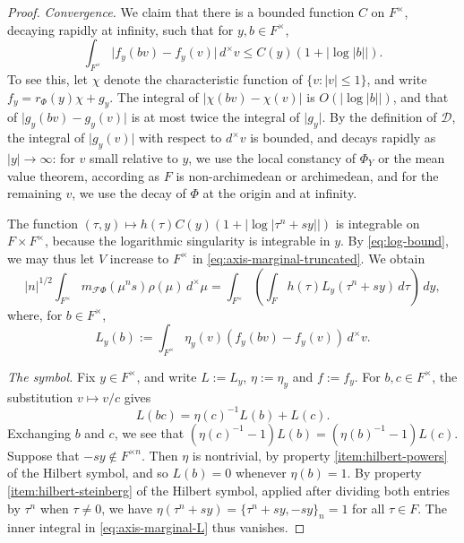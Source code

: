 \documentclass[reqno]{amsart}
\theoremstyle{plain}
\theoremstyle{definition}
\theoremstyle{itplain}
\numberwithin{equation}{section}
\numberwithin{theorem}{section}
\begin{document}
\begin{proof}
  \emph{Convergence.}  We claim that there is a bounded function $C$ on $F^\times$, decaying rapidly at infinity, such that for $y, b \in F^\times$,
  \begin{equation}\label{eq:log-bound}
    \int_{F^\times} \lvert f_y(b v) - f_y(v) \rvert \, d^\times v \leq C(y) (1 + \lvert \log \lvert b \rvert \rvert).
  \end{equation}
  To see this, let $\chi$ denote the characteristic function of $\{v : \lvert v \rvert \leq 1\}$, and write $f_y = r_\Phi(y) \chi + g_y$.  The integral of $\lvert \chi(b v) - \chi(v) \rvert$ is $O(\lvert \log \lvert b \rvert \rvert)$, and that of $\lvert g_y(b v) - g_y(v) \rvert$ is at most twice the integral of $\lvert g_y \rvert$.  By the definition of $\mathcal{D}$, the integral of $\lvert g_y(v) \rvert$ with respect to $d^\times v$ is bounded, and decays rapidly as $\lvert y \rvert \rightarrow \infty$: for $v$ small relative to $y$, we use the local constancy of $\Phi_Y$ or the mean value theorem, according as $F$ is non-archimedean or archimedean, and for the remaining $v$, we use the decay of $\Phi$ at the origin and at infinity.

  The function $(\tau, y) \mapsto h(\tau) C(y) (1 + \lvert \log \lvert \tau^n + s y \rvert \rvert)$ is integrable on $F \times F^\times$, because the logarithmic singularity is integrable in $y$.  By \eqref{eq:log-bound}, we may thus let $V$ increase to $F^\times$ in \eqref{eq:axis-marginal-truncated}.  We obtain
  \begin{equation}\label{eq:axis-marginal-L}
    \lvert n \rvert^{1/2} \int_{F^\times} m_{\mathcal{F} \Phi}(\mu^n s) \rho(\mu) \, d^\times \mu
    = \int_{F^\times} \left( \int_F h(\tau) L_y(\tau^n + s y) \, d \tau \right) \, d y,
  \end{equation}
  where, for $b \in F^\times$,
  \begin{equation*}
    L_y(b) := \int_{F^\times} \eta_y(v) \left( f_y(b v) - f_y(v) \right) \, d^\times v.
  \end{equation*}

  \emph{The symbol.}  Fix $y \in F^\times$, and write $L := L_y$, $\eta := \eta_y$ and $f := f_y$.  For $b, c \in F^\times$, the substitution $v \mapsto v / c$ gives
  \begin{equation}\label{eq:log-cocycle}
    L(b c) = \eta(c)^{-1} L(b) + L(c).
  \end{equation}
  Exchanging $b$ and $c$, we see that $(\eta(c)^{-1} - 1) L(b) = (\eta(b)^{-1} - 1) L(c)$.  Suppose that $- s y \notin F^{\times n}$.  Then $\eta$ is nontrivial, by property \eqref{item:hilbert-powers} of the Hilbert symbol, and so $L(b) = 0$ whenever $\eta(b) = 1$.  By property \eqref{item:hilbert-steinberg} of the Hilbert symbol, applied after dividing both entries by $\tau^n$ when $\tau \neq 0$, we have $\eta(\tau^n + s y) = \{\tau^n + s y, - s y\}_n = 1$ for all $\tau \in F$.  The inner integral in \eqref{eq:axis-marginal-L} thus vanishes.


\end{proof}
\end{document}
